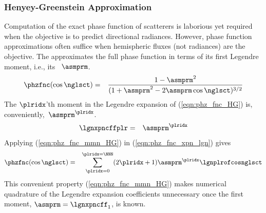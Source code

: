 \documentclass[12pt]{article}
\begin{document}
\subsubsection[Henyey-Greenstein Approximation]{Henyey-Greenstein Approximation}
Computation of the exact phase function of scatterers is laborious yet
required when the objective is to predict directional radiances.
However, phase function approximations often suffice when hemispheric
fluxes (not radiances) are the objective.
The  approximates the full
phase function in terms of its first Legendre moment, i.e., its
~$\asmprm$.
\begin{eqnarray}
\label{eqn:phz_fnc_HG}
\phzfnc(\cos\nglsct) 
& = & 
\frac{1-\asmprm^{2}}{(1+\asmprm^{2}-2\asmprm\cos\nglsct)^{3/2}}
\end{eqnarray}
The $\plridx$'th moment in the Legendre expansion of
(\ref{eqn:phz_fnc_HG}) is, conveniently,~$\asmprm^{\plridx}$.
\begin{eqnarray}
\lgnxpncffplr & = & \asmprm^{\plridx}
\label{eqn:phz_fnc_mmn_HG}
\end{eqnarray}
Applying (\ref{eqn:phz_fnc_mmn_HG}) in (\ref{eqn:phz_fnc_xpn_lgn}) gives
\begin{eqnarray}
\label{eqn:phz_fnc_xpn_lgn}
\phzfnc(\cos\nglsct) & = & \sum_{\plridx=0}^{\plridx=\NNN}
(2\plridx+1) \asmprm^{\plridx} \lgnplrofcosnglsct 
\end{eqnarray}
This convenient property (\ref{eqn:phz_fnc_mmn_HG}) makes numerical
quadrature of the Legendre expansion coefficients unnecessary once the
first moment, $\asmprm = \lgnxpncff_{1}$, is known.
\end{document}
